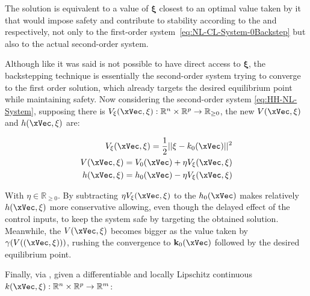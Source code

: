 The solution is equivalent to a value of \(\mathbf{\xi}\) closest to an optimal value taken by it that would impose safety and contribute to stability according to the  and  respectively, not only to the first-order system~\ref{eq:NL-CL-System-0Backstep} but also to the actual second-order system.\par
Although like it was said is not possible to have direct access to \(\mathbf{\xi}\), the backstepping technique is essentially the second-order system trying to converge to the first order solution, which already targets the desired equilibrium point while maintaining  safety. Now considering the second-order system \ref{eq:HH-NL-System}, supposing there is \( V_{\mathbf{\xi}}(\xVec, \mathbf{\xi}): \mathbb{R}^n \times \mathbb{R}^p \rightarrow \mathbb{R}_{\geq 0} \), the new  \(V(\xVec, \mathbf{\xi})\) and  \(h(\xVec, \mathbf{\xi})\) are:

\begin{subequations}
    \label{eq:Backstepp_CF}
    \begin{align}
        V_{\mathbf{\xi}}(\xVec, \mathbf{\xi}) = \frac{1}{2}|| \mathbf{\xi} -  k_0(\xVec) ||^2 
        \label{eq:Backstepp_prejudice}\\
        V(\xVec, \mathbf{\xi}) = V_0(\xVec) + \eta V_{\mathbf{\xi}}(\xVec, \mathbf{\xi}) 
        \label{eq:Backstepp_V}\\
        h(\xVec, \mathbf{\xi}) = h_0(\xVec) - \eta V_{\mathbf{\xi}}(\xVec, \mathbf{\xi})
        \label{eq:Backstepp_h}
    \end{align}
\end{subequations}


With \(\eta \in \mathbb{R}_{\geq 0}\). By subtracting \(\eta V_{\mathbf{\xi}}(\xVec, \mathbf{\xi})\) to the  \(h_0(\xVec)\) makes relatively \(h(\xVec, \xi)\) more conservative allowing, even though the delayed effect of the control inputs, to keep the system safe by targeting the obtained solution. Meanwhile, the  \(V(\xVec, \xi)\) becomes bigger as the value taken by \(\gamma(V((\xVec, \xi)))\), rushing the convergence to \(\mathbf{k}_0(\xVec)\) followed by the desired equilibrium point. \par
Finally, via , given a differentiable and locally Lipschitz continuous  \(k(\xVec, \mathbf{\xi}):\mathbb{R}^n \times \mathbb{R}^p \to \mathbb{R}^m\):

